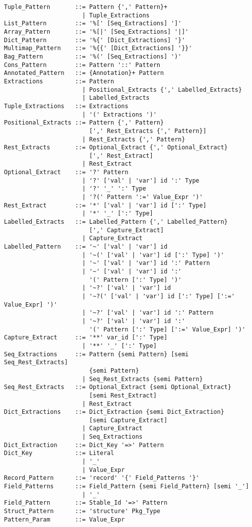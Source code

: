\begin{lstlisting}[deletekeywords={as,with}]
Tuple_Pattern       ::= Pattern {',' Pattern}+
                      | Tuple_Extractions
List_Pattern        ::= '%[' [Seq_Extractions] ']'
Array_Pattern       ::= '%[|' [Seq_Extractions] '|]'
Dict_Pattern        ::= '%{' [Dict_Extractions] '}'
Multimap_Pattern    ::= '%{{' [Dict_Extractions] '}}'
Bag_Pattern         ::= '%(' [Seq_Extractions] ')'
Cons_Pattern        ::= Pattern '::' Pattern
Annotated_Pattern   ::= {Annotation}+ Pattern
Extractions         ::= Pattern 
                      | Positional_Extracts {',' Labelled_Extracts}
                      | Labelled_Extracts
Tuple_Extractions   ::= Extractions
                      | '(' Extractions ')'
Positional_Extracts ::= Pattern {',' Pattern} 
                        [',' Rest_Extracts {',' Pattern}]
                      | Rest_Extracts {',' Pattern}
Rest_Extracts       ::= Optional_Extract {',' Optional_Extract} 
                        [',' Rest_Extract]
                      | Rest_Extract
Optional_Extract    ::= '?' Pattern
                      | '?' ['val' | 'var'] id ':' Type
                      | '?' '_' ':' Type
                      | '?(' Pattern ':=' Value_Expr ')'
Rest_Extract        ::= '*' ['val' | 'var'] id [':' Type]
                      | '*' '_' [':' Type]
Labelled_Extracts   ::= Labelled_Pattern {',' Labelled_Pattern} 
                        [',' Capture_Extract]
                      | Capture_Extract
Labelled_Pattern    ::= '~' ['val' | 'var'] id 
                      | '~(' ['val' | 'var'] id [':' Type] ')'
                      | '~' ['val' | 'var'] id ':' Pattern
                      | '~' ['val' | 'var'] id ':' 
                        '(' Pattern [':' Type] ')'
                      | '~?' ['val' | 'var'] id
                      | '~?(' ['val' | 'var'] id [':' Type] [':=' Value_Expr] ')'
                      | '~?' ['val' | 'var'] id ':' Pattern
                      | '~?' ['val' | 'var'] id ':' 
                        '(' Pattern [':' Type] [':=' Value_Expr] ')'
Capture_Extract     ::= '**' var_id [':' Type]
                      | '**' '_' [':' Type]
Seq_Extractions     ::= Pattern {semi Pattern} [semi Seq_Rest_Extracts] 
                        {semi Pattern}
                      | Seq_Rest_Extracts {semi Pattern}
Seq_Rest_Extracts   ::= Optional_Extract {semi Optional_Extract} 
                        [semi Rest_Extract]
                      | Rest_Extract
Dict_Extractions    ::= Dict_Extraction {semi Dict_Extraction}
                        [semi Capture_Extract]
                      | Capture_Extract
                      | Seq_Extractions
Dict_Extraction     ::= Dict_Key '=>' Pattern
Dict_Key            ::= Literal
                      | '_'
                      | Value_Expr
Record_Pattern      ::= 'record' '{' Field_Patterns '}'
Field_Patterns      ::= Field_Pattern {semi Field_Pattern} [semi '_']
                      | '_'
Field_Pattern       ::= Stable_Id '=>' Pattern
Struct_Pattern      ::= 'structure' Pkg_Type
Pattern_Param       ::= Value_Expr
\end{lstlisting}

